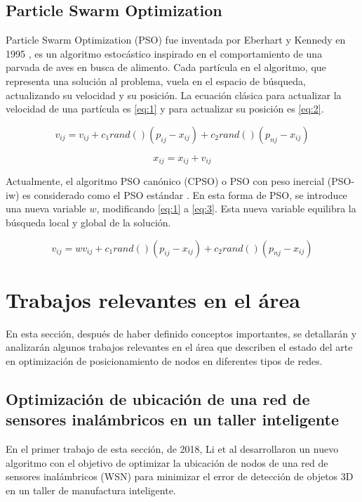 \documentclass[letterpaper]{report}
\begin{document}
  \subsection{Particle Swarm Optimization}\label{subsec:pso}
    Particle Swarm Optimization (PSO) fue inventada por Eberhart y Kennedy en
    1995 \cite{PSODef}, es un algoritmo
    estocástico inspirado en el comportamiento de una parvada de aves en busca
    de alimento. Cada partícula en el algoritmo, que representa una solución al
    problema, vuela en el espacio de búsqueda, actualizando su velocidad y su
    posición. La ecuación clásica para actualizar la velocidad de una partícula
    es \ref{eq:1} y para actualizar su posición es \ref{eq:2}.

    \begin{equation}
      \label{eq:1}
      v_{ij} = v_{ij} + c_1 rand()(p_{ij} - x_{ij}) + c_2 rand()(p_{nj} - x_{ij})
    \end{equation}

    \begin{equation}
      \label{eq:2}
      x_{ij} = x_{ij} + v_{ij}
    \end{equation}

    Actualmente, el algoritmo PSO canónico (CPSO) o PSO con peso inercial
    (PSO-iw) es considerado como el PSO estándar \cite{CPSO,PSOReview}.
    En esta forma de PSO, se introduce una nueva variable $w$, modificando
    \ref{eq:1} a \ref{eq:3}. Esta nueva variable equilibra la búsqueda local y
    global de la solución.

    \begin{equation}
      \label{eq:3}
      v_{ij} = w v_{ij} + c_1 rand()(p_{ij} - x_{ij}) + c_2 rand()(p_{nj} - x_{ij})
    \end{equation}

\section{Trabajos relevantes en el área}
  En esta sección, después de haber definido conceptos importantes, se
  detallarán y analizarán algunos trabajos relevantes en el área que describen
  el estado del arte en optimización de posicionamiento de nodos en diferentes
  tipos de redes.

  \subsection{Optimización de ubicación de una red de sensores inalámbricos en
    un taller inteligente}
    En el primer trabajo de esta sección, de 2018, Li et al \cite{3DAFAO}
    desarrollaron un nuevo algoritmo con el
    objetivo de optimizar la ubicación de nodos de una red de sensores
    inalámbricos (WSN) para minimizar el error de detección de objetos 3D en un
    taller de manufactura inteligente.
    
\end{document}
